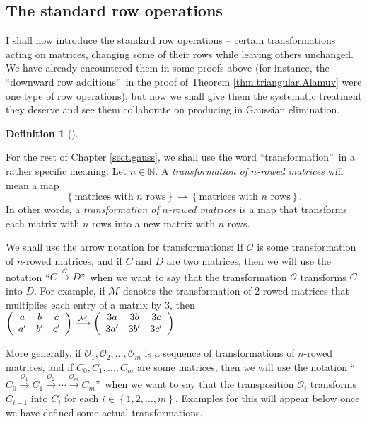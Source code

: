 \documentclass[numbers=enddot,12pt,final,onecolumn,notitlepage]{scrartcl}%
\theoremstyle{definition}
\newtheorem{defi}[theo]{Definition}
\newenvironment{definition}[1][]
{\begin{defi}[#1]\begin{leftbar}}
{\end{leftbar}\end{defi}}
\begin{document}
\subsection{The standard row operations}

I shall now introduce the standard row operations -- certain transformations
acting on matrices, changing some of their rows while leaving others
unchanged. We have already encountered them in some proofs above (for
instance, the \textquotedblleft downward row additions\textquotedblright\ in
the proof of Theorem \ref{thm.triangular.Alamuv} were one type of row
operations), but now we shall give them the systematic treatment they deserve
and see them collaborate on producing in Gaussian elimination.

\begin{definition}
For the rest of Chapter \ref{sect.gauss}, we shall use the word
\textquotedblleft transformation\textquotedblright\ in a rather specific
meaning: Let $n\in\mathbb{N}$. A \textit{transformation of }$n$\textit{-rowed
matrices} will mean a map%
\[
\left\{  \text{matrices with }n\text{ rows}\right\}  \rightarrow\left\{
\text{matrices with }n\text{ rows}\right\}  .
\]
In other words, a \textit{transformation of }$n$\textit{-rowed matrices} is a
map that transforms each matrix with $n$ rows into a new matrix with $n$ rows.

We shall use the arrow notation for transformations: If $\mathcal{O}$ is some
transformation of $n$-rowed matrices, and if $C$ and $D$ are two matrices,
then we will use the notation \textquotedblleft$C\overset{\mathcal{O}%
}{\longrightarrow}D$\textquotedblright\ when we want to say that the
transformation $\mathcal{O}$ transforms $C$ into $D$. For example, if
$\mathcal{M}$ denotes the transformation of $2$-rowed matrices that multiplies
each entry of a matrix by $3$, then $\left(
\begin{array}
[c]{ccc}%
a & b & c\\
a^{\prime} & b^{\prime} & c^{\prime}%
\end{array}
\right)  \overset{\mathcal{M}}{\longrightarrow}\left(
\begin{array}
[c]{ccc}%
3a & 3b & 3c\\
3a^{\prime} & 3b^{\prime} & 3c^{\prime}%
\end{array}
\right)  $.

More generally, if $\mathcal{O}_{1},\mathcal{O}_{2},\ldots,\mathcal{O}_{m}$ is
a sequence of transformations of $n$-rowed matrices, and if $C_{0}%
,C_{1},\ldots,C_{m}$ are some matrices, then we will use the notation
\textquotedblleft$C_{0}\overset{\mathcal{O}_{1}}{\longrightarrow}%
C_{1}\overset{\mathcal{O}_{2}}{\longrightarrow}\cdots\overset{\mathcal{O}%
_{m}}{\longrightarrow}C_{m}$\textquotedblright\ when we want to say that the
transposition $\mathcal{O}_{i}$ transforms $C_{i-1}$ into $C_{i}$ for each
$i\in\left\{  1,2,\ldots,m\right\}  $. Examples for this will appear below
once we have defined some actual transformations.


\end{definition}
\end{document}
